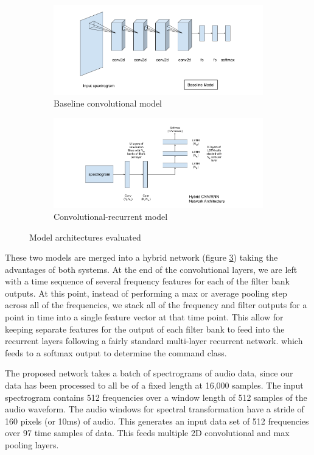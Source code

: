 \documentclass{article}
\begin{document}
\begin{figure}
  \begin{subfigure}{.45\textwidth}
    \includegraphics[width=\linewidth]{images/baseline}
    \caption{Baseline convolutional model}
    \label{fig:baseline}
  \end{subfigure}%
  \begin{subfigure}{.45\textwidth}
    \includegraphics[width=\linewidth]{images/crnn}
    \caption{Convolutional-recurrent model}
    \label{fig:crnn}
  \end{subfigure}
  \caption{Model architectures evaluated}
\end{figure}

These two models are merged into a hybrid network (figure
\ref{fig:crnn}) taking the
advantages of both systems. At the end of the convolutional layers, we
are left with a time sequence of several frequency features for each
of the filter bank outputs. At this point, instead of performing a max
or average pooling step across all of the frequencies, we stack all of
the frequency and filter outputs for a point in time into a single
feature vector at that time point. This allow for keeping separate
features for the output of each filter bank to feed into the recurrent
layers following a fairly standard multi-layer recurrent
network. which feeds to a softmax output to determine the command
class.

The proposed network takes a batch of spectrograms of audio data, since
our data has been processed to all be of a fixed length at 16,000
samples. The input spectrogram contains 512 frequencies over a window
length of 512 samples of the audio waveform. The audio windows for spectral
transformation have a stride of 160 pixels (or 10ms) of audio. This
generates an input data set of 512 frequencies over 97 time samples of
data. This feeds multiple 2D convolutional and max pooling layers.
\end{document}
